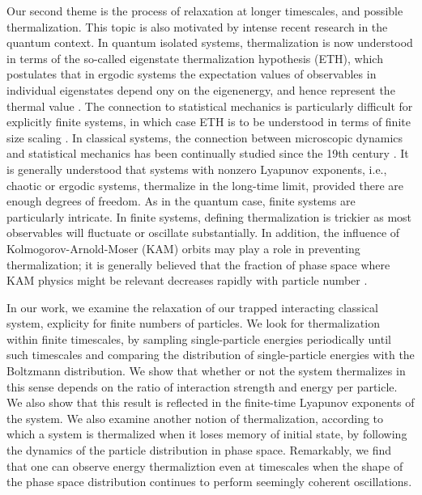 \documentclass[a4paper, onecolumn]{revtex4-1}
\begin{document}
Our second theme is the process of relaxation at longer timescales, and possible thermalization.
This topic is also motivated by intense recent research in the quantum context.  In quantum isolated
systems, thermalization is now understood in terms of the so-called eigenstate thermalization
hypothesis (ETH), which postulates that in ergodic systems the expectation values of observables in
individual eigenstates depend ony on the eigenenergy, and hence represent the thermal value
\cite{PolkovnikovRigol_AdvPhys2016, BorgonoviIzrailevSantos_PhysRep2016,
  ETH_Deutsch_Srednicki_Rigol}.  The connection to statistical mechanics is particularly difficult
for explicitly finite systems, in which case ETH is to be understood in terms of finite size scaling
\cite{Beugeling_ETHscaling_PRE14}.  In classical systems, the connection between microscopic dynamics and statistical mechanics
has been continually studied since the 19th century \cite{Dorfman_book_1999, Dumas_book_KAMstory,
  Boltzmann_legacy_book, EckmannRuelle_RMP85}.  It is generally understood that systems with nonzero
Lyapunov exponents, i.e., chaotic or ergodic systems, thermalize in the long-time limit, provided
there are enough degrees of freedom.  As in the quantum case, finite systems are particularly
intricate.  In finite systems, defining thermalization is trickier as most observables will
fluctuate or oscillate substantially.  In addition, the influence of Kolmogorov-Arnold-Moser (KAM)
orbits may play a role in preventing thermalization; it is generally believed that the fraction of
phase space where KAM physics might be relevant decreases rapidly with particle number
\cite{Dumas_book_KAMstory}.

In our work, we examine the relaxation of our trapped interacting classical system, explicity for
finite numbers of particles.  We look for thermalization within finite timescales, by sampling
single-particle energies periodically until such timescales and comparing the distribution of
single-particle energies with the Boltzmann distribution.  We show that whether or not the system
thermalizes in this sense depends on the ratio of interaction strength and energy per particle.  We
also show that this result is reflected in the finite-time Lyapunov exponents of the system.
%
We also examine another notion of thermalization, according to which a system is thermalized when it
loses memory of initial state, by following the dynamics of the particle distribution in phase
space.  Remarkably, we find that one can observe energy thermaliztion even at timescales when the
shape of the phase space distribution continues to perform seemingly coherent oscillations.
\end{document}
